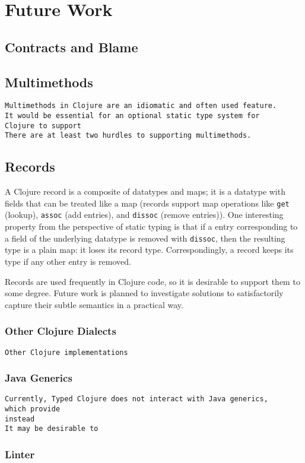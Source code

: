 \chapter{Future Work}

\section{Contracts and Blame}
\label{sec:contractsblame}

\section{Multimethods}
\label{sec:mmfuture}

\begin{verbatim}
Multimethods in Clojure are an idiomatic and often used feature.
It would be essential for an optional static type system for
Clojure to support
There are at least two hurdles to supporting multimethods.
\end{verbatim}


\section{Records}

A Clojure record is a composite of datatypes and maps; it is a datatype
with fields that can be treated like a map (records support map operations like \lstinline|get| (lookup),
\lstinline|assoc| (add entries), and \lstinline|dissoc| (remove entries)).
One interesting property from the perspective of static typing is that if
a entry corresponding to a field of the underlying datatype is removed
with \lstinline|dissoc|, then the resulting type is a plain map: it loses
its record type.
Correspondingly, a record keeps its type if any other entry is removed.

Records are used frequently in Clojure code, so it is desirable
to support them to some degree. Future work is planned to investigate solutions
to satisfactorily capture their subtle semantics in a practical way.

\subsection{Other Clojure Dialects}

\begin{verbatim}
Other Clojure implementations
\end{verbatim}

\subsection{Java Generics}

\begin{verbatim}
Currently, Typed Clojure does not interact with Java generics,
which provide
instead 
It may be desirable to 
\end{verbatim}

\subsection{Linter}
